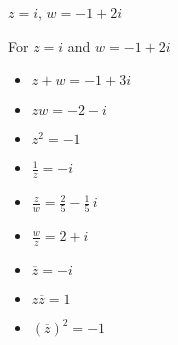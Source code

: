 {$z = i$, $w = -1+2i$}
{For  $z = i$ and $w = -1+2i$

\begin{itemize}

\item $z+w = -1+3i$

\item $zw = -2-i$

\item $z^2 = -1$

\item $\frac{1}{z} = -i$

\item $\frac{z}{w} = \frac{2}{5} - \frac{1}{5} \, i$

\item $\frac{w}{z} = 2+i$

\item $\overline{z} = -i$

\item $z\overline{z} = 1$

\item $(\overline{z})^2 = -1$

\end{itemize}
}
